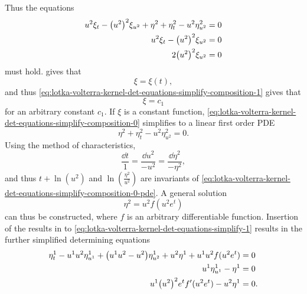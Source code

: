 Thus the equations
\begin{align}
  \label{eq:lotka-volterra-kernel-det-equations-simplify-composition-0}
  u^2 \xi_t - \qty(u^2)^2 \xi_{u^2} + \eta^2 + \eta^2_t - u^2 \eta^2_{u^2} &= 0\\
  \label{eq:lotka-volterra-kernel-det-equations-simplify-composition-1}
  u^2 \xi_t - \qty(u^2)^2 \xi_{u^2} &= 0\\
  \label{eq:lotka-volterra-kernel-det-equations-simplify-composition-2}
  2 \qty(u^2)^2 \xi_{u^2} &= 0
\end{align}
must hold.
 gives that
\begin{equation}
  \xi = \xi(t),
\end{equation}
and thus \cref{eq:lotka-volterra-kernel-det-equations-simplify-composition-1} gives that
\begin{equation}
  \xi = c_1
\end{equation}
for an arbitrary constant \(c_1\).
If \(\xi\) is a constant function, \cref{eq:lotka-volterra-kernel-det-equations-simplify-composition-0} simplifies to a linear first order PDE
\begin{equation}
  \eta^2 + \eta^2_t - u^2 \eta^2_{u^2} = 0.
\end{equation}
Using the method of characteristics,
\begin{equation}\label{eq:lotka-volterra-kernel-det-equations-simplify-composition-0-pde}
  \frac{\dd{t}}{1} = \frac{\dd{u^2}}{-u^2} = \frac{\dd{\eta^2}}{-\eta^2},
\end{equation}
and thus \(t + \ln(u^2)\) and \(\ln(\frac{\eta^2}{u^2})\) are invariants of \cref{eq:lotka-volterra-kernel-det-equations-simplify-composition-0-pde}.
A general solution
\begin{equation}
  \eta^2 = u^2 f(u^2 e^t)
\end{equation}
can thus be constructed, where \(f\) is an arbitrary differentiable function.
Insertion of the results in to \cref{eq:lotka-volterra-kernel-det-equations-simplify-1} results in the further simplified determining equations
\begin{subequations}\label{eq:lotka-volterra-kernel-det-equations-simplify-2}
  \begin{align}
    \label{eq:lotka-volterra-kernel-det-equations-simplify-2-1}
      \eta^1_t - u^1 u^2 \eta^1_{u^1} + \qty(u^1 u^2 - u^2) \eta^1_{u^2} + u^2 \eta^1 + u^1 u^2 f(u^2 e^t) &= 0 \\
    \label{eq:lotka-volterra-kernel-det-equations-simplify-2-2}
    u^1 \eta^1_{u^1} - \eta^1 &= 0 \\
    \label{eq:lotka-volterra-kernel-det-equations-simplify-2-4}
    u^1 \qty(u^2)^2 e^t f'(u^2 e^t) - u^2 \eta^1 &= 0.
  \end{align}
\end{subequations}
